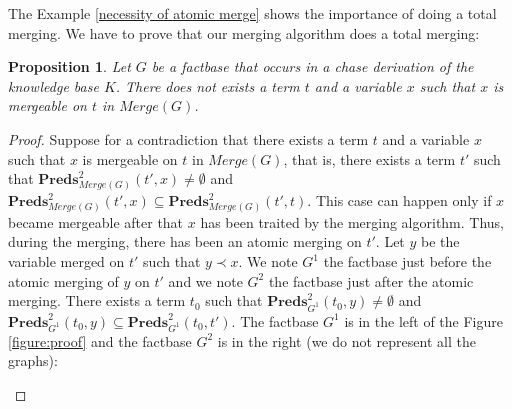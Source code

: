 \documentclass{article}
\newtheorem{proposition}{Proposition}[section]
\theoremstyle{definition}
\theoremstyle{remark}
\newcommand{\Preds}{\textbf{Preds}}
\newcommand{\Merge}{\textit{Merge}}
\begin{document}
The Example \ref{necessity of atomic merge} shows the importance of doing a total merging. We have to prove that our merging algorithm does a total merging:

\begin{proposition}\label{no_more_siblings}
Let $G$ be a factbase that occurs in a chase derivation of the knowledge base $K$. There does not exists a term $t$ and a variable $x$ such that $x$ is mergeable on $t$ in $\Merge(G)$.
\end{proposition}

\begin{proof} 
Suppose for a contradiction that there exists a term $t$ and a variable $x$ such that $x$ is mergeable on $t$ in $\Merge(G)$, that is, there exists a term $t'$ such that $\Preds^2_{\Merge(G)}(t',x) \neq \emptyset$ and $\Preds_{\Merge(G)}^2(t',x) \subseteq \Preds_{\Merge(G)}^2(t',t)$. This case can happen only if $x$ became mergeable after that $x$ has been traited by the merging algorithm. Thus, during the merging, there has been an atomic merging on $t'$. Let $y$ be the variable merged on $t'$ such that $y \prec x$. We note $G^1$ the factbase just before the atomic merging of $y$ on $t'$ and we note $G^2$ the factbase just after the atomic merging. There exists a term $t_0$ such that $\Preds^2_{G^1}(t_0,y) \neq \emptyset$ and $\Preds_{G^1}^2(t_0,y) \subseteq \Preds_{G^1}^2(t_0,t')$. The factbase $G^1$ is in the left of the Figure \ref{figure:proof} and the factbase $G^2$ is in the right (we do not represent all the graphs):

\begin{figure}
\begin{center}
\end{center}
\end{figure}
\end{proof}
\end{document}
